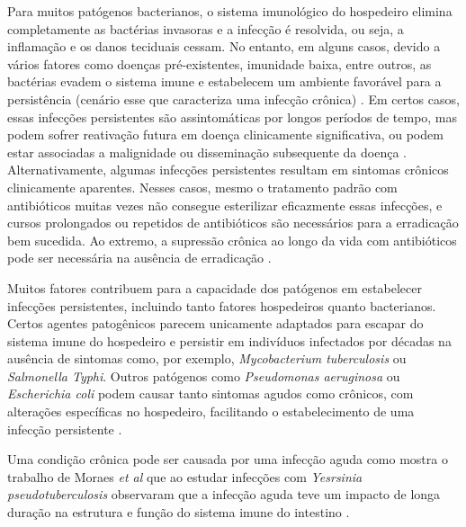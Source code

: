 \documentclass[a4paper,10pt]{article}
\begin{document}
		Para muitos patógenos bacterianos, o sistema imunológico do hospedeiro elimina completamente as bactérias invasoras 
		e a infecção é resolvida, ou seja, a inflamação e os danos teciduais cessam. No entanto, em alguns casos, devido 
		a vários fatores como doenças pré-existentes, imunidade baixa, entre outros, as bactérias evadem o sistema imune 
		e estabelecem um ambiente favorável para a persistência (cenário esse que caracteriza uma infecção crônica) \cite{Grant2013}. 
		Em certos casos, essas infecções persistentes são assintomáticas 
		por longos períodos de tempo, mas podem sofrer reativação futura em doença clinicamente significativa, ou podem estar 
		associadas a malignidade ou disseminação subsequente da doença \cite{Grant2013}. Alternativamente, algumas infecções persistentes 
		resultam em sintomas crônicos clinicamente aparentes. Nesses casos, mesmo o tratamento padrão com antibióticos muitas 
		vezes não consegue esterilizar eficazmente essas infecções, e cursos prolongados ou repetidos de antibióticos 
		são necessários para a erradicação bem sucedida. Ao extremo, a supressão crônica ao longo da vida com antibióticos 
		pode ser necessária na ausência de erradicação \cite{Grant2013}.		
		
		Muitos fatores contribuem para a capacidade dos patógenos em estabelecer infecções persistentes, incluindo tanto 
		fatores hospedeiros quanto bacterianos. Certos agentes patogênicos parecem unicamente adaptados para escapar do 
		sistema imune do hospedeiro e persistir em indivíduos infectados por décadas na ausência de sintomas como, por exemplo, 
		\textit{Mycobacterium tuberculosis} ou \textit{Salmonella Typhi}. Outros patógenos como \textit{Pseudomonas aeruginosa} 
		ou \textit{Escherichia coli} podem causar tanto sintomas agudos como crônicos, com alterações específicas no hospedeiro, 
		facilitando o estabelecimento de uma infecção persistente \cite{Grant2013}.
		
		Uma condição crônica pode ser causada por uma infecção aguda como mostra o trabalho de Moraes \textit{et al} \cite{Fonseca2015} que ao estudar infecções 
		com \textit{Yesrsinia pseudotuberculosis} observaram que a infecção aguda teve um impacto de longa duração na estrutura e função do sistema imune do intestino \cite{Fonseca2015}. 
		
\end{document}
